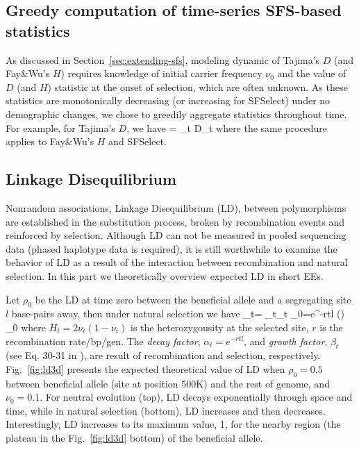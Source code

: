 \documentclass[11pt]{article}
\begin{document}
\subsection{Greedy computation of time-series SFS-based  
statistics}\label{app:agg}
As discussed in Section~\ref{sec:extending-sfs}, modeling dynamic of
Tajima's $D$ (and Fay\&Wu's $H$) requires knowledge of initial carrier
frequency $\nu_0$ and the value of $D$ (and $H$) statistic at the
onset of selection, which are often unknown.  As these statistics are
monotonically decreasing (or increasing for SFSelect) under no
demographic changes, we chose to greedily aggregate statistics
throughout time. For example, for Tajima's $D$, we have \beq \Dc =
\sum_{t \in \Tc} D_t \eeq where the same procedure applies to
Fay\&Wu's $H$ and SFSelect.


\subsection{Linkage Disequilibrium}
Nonrandom associations, Linkage Disequilibrium (LD), between 
polymorphisms are established in the 
substitution process, broken by recombination events 
and reinforced by selection. 
Although LD can not be measured in pooled sequencing data (phased 
haplotype data is required), it is still worthwhile 
to examine the behavior of LD as a result of the interaction between 
recombination and natural selection. In this part we theoretically overview 
expected LD in short EEs.

Let $\rho_0$ be the LD at time zero between the beneficial allele and a 
segregating site $l$ base-pairs away, then under natural selection we have
\beq
\rho_t= \alpha_t\beta_t \rho_0=e^{-rtl} \left(\right)  
\rho_0\label{eq:ldt}
\eeq
where $H_t=2\nu_t(1-\nu_t)$ is the heterozygousity at the selected site, $r$ is 
the recombination rate/bp/gen. The 
\emph{decay factor}, $\alpha_t=e^{-rtl}$,
and \emph{growth factor}, $\beta_t$ (see Eq. 30-31 in 
\cite{Stephan2006The}), are result of recombination and 
selection, respectively. Fig.~\ref{fig:ld3d} presents the expected theoretical 
value of LD when $\rho_0=0.5$ between beneficial allele (site at position 500K) 
and the rest of 
genome, and $\nu_0=0.1$. For neutral evolution (top), LD decays exponentially 
through space and time, while in natural selection (bottom), LD increases and 
then decreases. Interestingly, LD increases to its maximum value, 1, for the 
nearby region (the plateau in the Fig.~\ref{fig:ld3d} bottom) of the beneficial 
allele.
\end{document}
